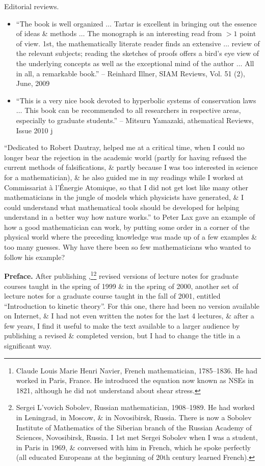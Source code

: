 \documentclass{article}
\begin{document}
\begin{enumerate}
	{\sf Editorial reviews.}
	\begin{itemize}
		\item ``The book is well organized $\ldots$ {\sc Tartar} is excellent in bringing out the essence of ideas \& methods $\ldots$ The monograph is an interesting read from $> 1$ point of view. 1st, the mathematically literate reader finds an extensive $\ldots$ review of the relevant subjects; reading the sketches of proofs offers a bird's eye view of the underlying concepts as well as the exceptional mind of the author $\ldots$ All in all, a remarkable book.'' -- {\sc Reinhard Illner}, SIAM Reviews, Vol. 51 (2), June, 2009
		\item ``This is a very nice book devoted to hyperbolic systems of conservation laws $\ldots$ This book can be recommended to all researchers in respective areas, especially to graduate students.'' -- {\sc Mitsuru Yamazaki}, athematical Reviews, Issue 2010 j
	\end{itemize}
	``Dedicated to {\sc Robert Dautray}, helped me at a critical time, when I could no longer bear the rejection in the academic world (partly for having refused the current methods of falsifications, \& partly because I was too interested in science for a mathematician), \& he also guided me in my readings while I worked at Commissariat à l'\'Energie Atomique, so that I did not get lost like many other mathematicians in the jungle of models which physicists have generated, \& I could understand what mathematical tools should be developed for helping understand in a better way how nature works.'' to {\sc Peter Lax} gave an example of how a good mathematician can work, by putting some order in a corner of the physical world where the preceding knowledge was made up of a few examples \& too many guesses. Why have there been so few mathematicians who wanted to follow his example?
	
	{\bf Preface.} After publishing \cite{Tartar2006,Tartar2007},\footnote{{\sc Claude Louis Marie Henri Navier}, French mathematician, 1785--1836. He had worked in Paris, France. He introduced the equation now known as NSEs in 1821, although he did not understand about shear stress.}\footnote{{\sc Sergei L'vovich Sobolev}, Russian mathematician, 1908--1989. He had worked in Leningrad, in Moscow, \& in Novosibirsk, Russia. There is now a Sobolev Institute of Mathematics of the Siberian branch of the Russian Academy of Sciences, Novosibirsk, Russia. I 1st met {\sc Sergei Sobolev} when I was a student, in Paris in 1969, \& conversed with him in French, which he spoke perfectly (all educated Europeans at the beginning of 20th century learned French).} revised versions of lecture notes for graduate courses taught in the spring of 1999 \& in the spring of 2000, another set of lecture notes for a graduate course taught in the fall of 2001, entitled ``Introduction to kinetic theory''. For this one, there had been no version available on Internet, \& I had not even written the notes for the last 4 lectures, \& after a few years, I find it useful to make the text available to a larger audience by publishing a revised \& completed version, but I had to change the title in a significant way.
	

\end{enumerate}
\end{document}
